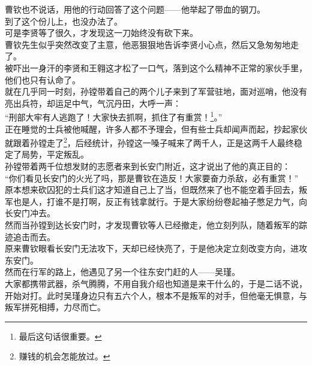 \begin{multicols}{\theparacolNo}
曹钦也不说话，用他的行动回答了这个问题——他举起了带血的钢刀。\\

到了这个份儿上，也没办法了。\\

可是李贤等了很久，才发现这一刀始终没有砍下来。\\

曹钦先生似乎突然改变了主意，他恶狠狠地告诉李贤小心点，然后又急匆匆地走了。\\

被吓出一身汗的李贤和王翱这才松了一口气，落到这个么精神不正常的家伙手里，他们也只有认命了。\\

就在几乎同一时刻，孙镗带着自己的两个儿子来到了军营驻地，面对巡哨，他没有亮出兵符，却运足中气，气沉丹田，大呼一声：\\

“刑部大牢有人逃跑了！大家快去抓啊，抓住了有重赏！\footnote{最后这句话很重要。}。”\\

正在睡觉的士兵被他喊醒，许多人都不予理会，但有些士兵却闻声而起，抄起家伙就跟着孙镗走了\footnote{赚钱的机会怎能放过。}，后经统计，孙镗这一嗓子喊来了两千人，正是这两千人最终稳定了局势，平定叛乱。\\

孙镗带着两千位想发财的志愿者来到长安门附近，这才说出了他的真正目的：\\

“你们看见长安门的火光了吗，那是曹钦在造反！大家要奋力杀敌，必有重赏！”\\

原本想来砍囚犯的士兵们这才知道自己上了当，但既然来了也不能空着手回去，叛军也是人，打谁不是打啊，反正有钱拿就行。于是大家纷纷卷起袖子憋足力气，向长安门冲去。\\

然而当孙镗到达长安门时，才发现曹钦等人已经撤走，他立刻列队，随着叛军的踪迹追击而去。\\

原来曹钦眼看长安门无法攻下，天却已经快亮了，于是他决定立刻改变方向，进攻东安门。\\

然而在行军的路上，他遇见了另一个往东安门赶的人——吴瑾。\\

大家都携带武器，杀气腾腾，不用自我介绍也知道是来干什么的，于是二话不说，开始对打。此时吴瑾身边只有五六个人，根本不是叛军的对手，但他毫无惧意，与叛军拼死相搏，力尽而亡。\\


\end{multicols}
